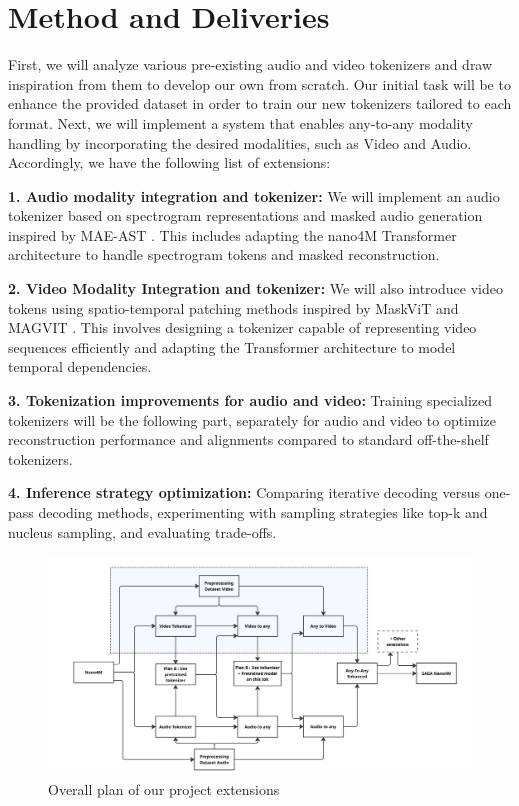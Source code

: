 \documentclass[10pt,conference,compsocconf]{IEEEtran}
\begin{document}
\section{Method and Deliveries}
First, we will analyze various pre-existing audio and video tokenizers and draw inspiration from them to develop our own from scratch. Our initial task will be to enhance the provided dataset in order to train our new tokenizers tailored to each format. Next, we will implement a system that enables any-to-any modality handling by incorporating the desired modalities, such as Video and Audio. Accordingly, we have the following list of extensions:

\textbf{1. Audio modality integration and tokenizer:}
We will implement an audio tokenizer based on spectrogram representations and masked audio generation inspired by MAE-AST \cite{baade_mae-ast_2022}. This includes adapting the nano4M Transformer architecture to handle spectrogram tokens and masked reconstruction.

\textbf{2. Video Modality Integration and tokenizer:}
We will also introduce video tokens using spatio-temporal patching methods inspired by MaskViT \cite{gupta_maskvit_2022} and MAGVIT \cite{yu_magvit_2023}. This involves designing a tokenizer capable of representing video sequences efficiently and adapting the Transformer architecture to model temporal dependencies.

\textbf{3. Tokenization improvements for audio and video:}
Training specialized tokenizers will be the following part, separately for audio and video to optimize reconstruction performance and alignments compared to standard off-the-shelf tokenizers.

\textbf{4. Inference strategy optimization:}
Comparing iterative decoding versus one-pass decoding methods, experimenting with sampling strategies like top-k and nucleus sampling, and evaluating trade-offs.

   
    
\begin{figure}[tbph]
  \centering
  \includegraphics[width=1\columnwidth]{latex-proposal-template/Extensions.pdf}
  \caption{Overall plan of our project extensions}
  \vspace{-3mm}
  \label{fig:placeholder1}
\end{figure}
\end{document}
